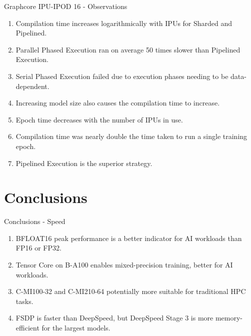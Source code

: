 \documentclass[t]{beamer}
\begin{document}
\begin{frame}{Graphcore IPU-IPOD 16 - Observations}

\begin{enumerate}
  \item Compilation time increases logarithmically with IPUs for Sharded and Pipelined.
  \item Parallel Phased Execution ran on average 50 times slower than Pipelined Execution.
  \item Serial Phased Execution failed due to execution phases needing to be data-dependent.
  \item Increasing model size also causes the compilation time to increase.
  \item Epoch time decreases with the number of IPUs in use.
  \item Compilation time was nearly double the time taken to run a single training epoch.
  \item Pipelined Execution is the superior strategy.
\end{enumerate}

\end{frame}

\section{Conclusions}

\begin{frame}{Conclusions - Speed}

\begin{enumerate}
  \item BFLOAT16 peak performance is a better indicator for AI workloads than FP16 or FP32.
  \item Tensor Core on B-A100 enables mixed-precision training, better for AI workloads.
  \item C-MI100-32 and C-MI210-64 potentially more suitable for traditional HPC tasks.
  \item FSDP is faster than DeepSpeed, but DeepSpeed Stage 3 is more memory-efficient for the largest models.
\end{enumerate}

\end{frame}
\end{document}

